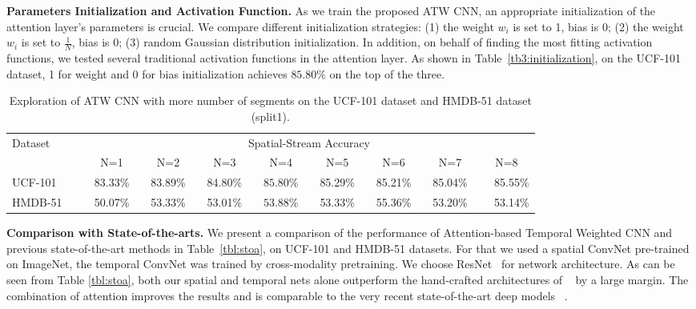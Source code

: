 \documentclass[runningheads,a4paper]{llncs}
\begin{document}
\noindent \textbf{Parameters Initialization and Activation Function.}
As we train the proposed ATW CNN, an appropriate initialization of the attention
layer's parameters is crucial. We compare different initialization strategies: (1) the weight $w_i$ is set to 1,
bias is 0; (2) the weight $w_i$ is set to $\frac{1}{N}$, bias is 0; (3) random Gaussian distribution initialization.
In addition, on behalf of finding the most fitting activation functions,
we tested several traditional activation functions in the attention layer.
As shown in Table~\ref{tb3:initialization}, on the UCF-101 dataset, 1 for weight and 0 for bias initialization
achieves $85.80\%$ on the top of the three.
\begin{table*}[t]
	\caption{Exploration of ATW CNN with more number
		of segments on the UCF-101 dataset and HMDB-51 dataset (split1).}
	\label{tb2:attention}
	\begin{center}
		\begin{small}
			\begin{tabular}{lcccccccr}
				\toprule
				\multirow{2}{*}{Dataset~~~~~} & \multicolumn{8}{c}{Spatial-Stream Accuracy} \\
				\cline{2-9}
				& ~~N=1~~ & ~~N=2~~ & ~~N=3~~ & ~~N=4~~ & ~~N=5~~ & ~~N=6~~ & ~~N=7~~ & ~~N=8~~  \\
				\midrule
				UCF-101 & 83.33\% & 83.89\% & 84.80\% & $\mathbf{85.80\%}$ &  85.29\% & 85.21\% & 85.04\% & 85.55\% \\
				HMDB-51 & 50.07\% & 53.33\% & 53.01\% & $\mathbf{53.88\%}$  & 53.33\% & 55.36\% & 53.20\% & 53.14\% \\
				\bottomrule
			\end{tabular}
		\end{small}
	\end{center}
\end{table*}



\noindent \textbf{Comparison with State-of-the-arts.} We present a comparison of the performance of Attention-based Temporal Weighted CNN and previous
state-of-the-art methods in Table~\ref{tbl:stoa}, on UCF-101 and HMDB-51 datasets. For that we used a
spatial ConvNet pre-trained on ImageNet, the temporal ConvNet was trained by cross-modality
pretraining. We choose ResNet~\cite{he2016deep} for network architecture.
As can be seen from Table \ref{tbl:stoa}, both our spatial and temporal nets
alone outperform the hand-crafted architectures of
~\cite{cai2014multi,wang2013action,peng2016bag,wang2016mofap}
by a large margin. The combination of
attention improves the results and is comparable
to the very recent state-of-the-art deep models
~\cite{simonyan2014two,wang2016temporal,sun2015human,tran2015learning,
wang2015action,varol2017long,zhu2016key,fernando2015modeling,ni2015motion}.
\end{document}
